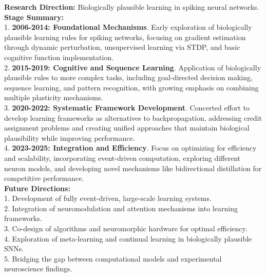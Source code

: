 \documentclass{llmxive}
\begin{document}
\begin{tcolorbox}[breakable,colback=persona!20!white, colframe=persona!60!black, title=\textbf{An Example of Research Trend Predicting}]
    \label{box:trend}
    \textbf{Research Direction:} Biologically plausible learning in spiking neural networks.\\
    \textbf{Stage Summary:}\\
    1. \textbf{2006-2014: Foundational Mechanisms}. Early exploration of biologically plausible learning rules for spiking networks, focusing on gradient estimation through dynamic perturbation, unsupervised learning via STDP, and basic cognitive function implementation.\\
    2. \textbf{2015-2019: Cognitive and Sequence Learning}. Application of biologically plausible rules to more complex tasks, including goal-directed decision making, sequence learning, and pattern recognition, with growing emphasis on combining multiple plasticity mechanisms.\\
    3. \textbf{2020-2022: Systematic Framework Development}. Concerted effort to develop learning frameworks as alternatives to backpropagation, addressing credit assignment problems and creating unified approaches that maintain biological plausibility while improving performance.\\
    4. \textbf{2023-2025: Integration and Efficiency}. Focus on optimizing for efficiency and scalability, incorporating event-driven computation, exploring different neuron models, and developing novel mechanisms like bidirectional distillation for competitive performance.\\
    \textbf{Future Directions:}\\
    1. Development of fully event-driven, large-scale learning systems.\\
    2. Integration of neuromodulation and attention mechanisms into learning frameworks.\\
    3. Co-design of algorithms and neuromorphic hardware for optimal efficiency.\\
    4. Exploration of meta-learning and continual learning in biologically plausible SNNs.\\
    5. Bridging the gap between computational models and experimental neuroscience findings.
\end{tcolorbox}
\end{document}

